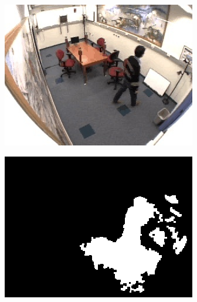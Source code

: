 \begin{figure}
  \centering
  \begin{subfigure}{.49\linewidth}
  \centering
  \includegraphics[width=1\linewidth]{figures/background/room_0295_frame.jpg}
  \caption{}
  \end{subfigure}
  \hfill
  \begin{subfigure}{.49\linewidth}
  \centering
  \includegraphics[width=1\linewidth]{figures/background/room_0295_blob.jpg}
  \caption{}
  \end{subfigure}
  \hfill
  \begin{subfigure}{.49\linewidth}
  \centering

\end{subfigure}
\end{figure}
